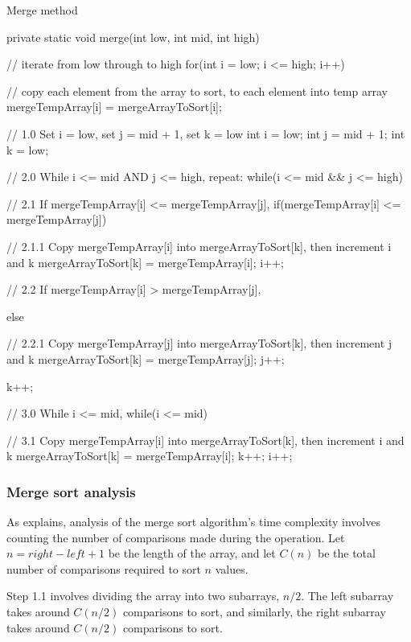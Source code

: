 \begin{listing}[H]
\caption{Merge method}
\begin{javacode}
private static void merge(int low, int mid, int high) {

    // iterate from low through to high
    for(int i = low; i <= high; i++) {

        // copy each element from the array to sort, to each element into temp array
        mergeTempArray[i] = mergeArrayToSort[i];
    }

    // 1.0 Set i = low, set j = mid + 1, set k = low
    int i = low;
    int j = mid + 1;
    int k = low;

    // 2.0 While i <= mid AND j <= high, repeat:
    while(i <= mid && j <= high) {

        // 2.1 If mergeTempArray[i] <= mergeTempArray[j],
        if(mergeTempArray[i] <= mergeTempArray[j]) {

            // 2.1.1 Copy mergeTempArray[i] into mergeArrayToSort[k], then increment i and k
            mergeArrayToSort[k] = mergeTempArray[i];
            i++;

        // 2.2 If mergeTempArray[i] > mergeTempArray[j],
        } else {

            // 2.2.1 Copy mergeTempArray[j] into mergeArrayToSort[k], then increment j and k
            mergeArrayToSort[k] = mergeTempArray[j];
            j++;
        }
        k++;
    }

    // 3.0 While i <= mid,
    while(i <= mid) {

        // 3.1 Copy mergeTempArray[i] into mergeArrayToSort[k], then increment i and k
        mergeArrayToSort[k] = mergeTempArray[i];
        k++;
        i++;
    }
}
\end{javacode}
\end{listing}

\subsubsection{Merge sort analysis}

As \citet[p. 54]{Watt2001} explains, analysis of the merge sort algorithm's time complexity involves counting the number of comparisons made during the operation. Let $n = right - left + 1$ be the length of the array, and let $C(n)$ be the total number of comparisons required to sort $n$ values.

Step 1.1 involves dividing the array into two subarrays, $n/2$. The left subarray takes around $C(n/2)$ comparisons to sort, and similarly, the right subarray takes around $C(n/2)$ comparisons to sort.

